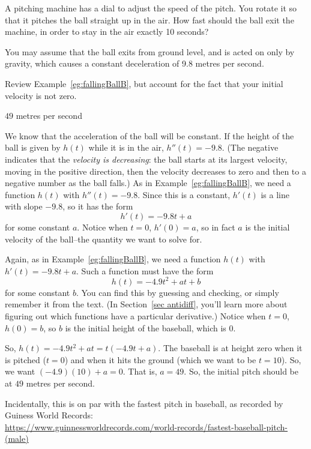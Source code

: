 \begin{question}
A pitching machine has a dial to adjust the speed of the pitch. You rotate it so that it pitches the ball straight up in the air. How fast should the ball exit the machine, in order to stay in the air exactly 10 seconds?

You may assume that the ball exits from ground level, and is acted on only by gravity, which causes a constant deceleration of 9.8 metres per second.
\end{question}
\begin{hint}
Review Example~\ref*{eg:fallingBallB}, but account for the fact that your initial velocity is not zero.
\end{hint}
\begin{answer}
$49$ metres per second
\end{answer}
\begin{solution}
We know that the acceleration of the ball will be constant. If the height of the ball is given by $h(t)$ while it is in the air, $h''(t)=-9.8$. (The negative indicates that the \emph{velocity is decreasing}: the ball starts at its largest velocity, moving in the positive direction, then the velocity decreases to zero and then to a negative number as the ball falls.) As in Example~\ref*{eg:fallingBallB}, we need a function $h(t)$ with $h''(t)=-9.8$. Since this is a constant, $h'(t)$ is a line with slope $-9.8$, so it has the form \[h'(t)=-9.8t+a\] for some constant $a$. Notice when $t=0$, $h'(0)=a$, so in fact $a$ is the initial velocity of the ball--the quantity we want to solve for.

Again, as in Example~\ref*{eg:fallingBallB}, we need a function $h(t)$ with $h'(t)=-9.8t+a$. Such a function must have the form \[h(t)=-4.9t^2+at+b\] for some constant $b$. You can find this by guessing and checking, or simply remember it from the text. (In Section~\ref*{sec antidiff}, you'll learn more about figuring out which functions have a particular derivative.) Notice when $t=0$, $h(0)=b$, so $b$ is the initial height of the baseball, which is 0.

So, $h(t)=-4.9t^2+at = t(-4.9t+a)$. The baseball is at height zero when it is pitched ($t=0$) and when it hits the ground (which we want to be $t=10$). So, we want $(-4.9)(10)+a=0$. That is, $a=49$. So, the initial pitch should be at $49$ metres per second.

Incidentally, this is on par with the fastest pitch in baseball, as recorded by Guiness World Records:\\ \small\url{https://www.guinnessworldrecords.com/world-records/fastest-baseball-pitch-(male)}
\end{solution}



